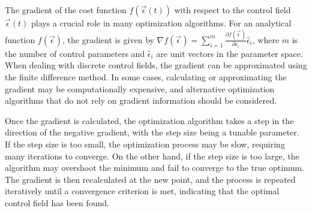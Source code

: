 \documentclass[12pt]{report}
\begin{document}
\par
The gradient of the cost function $f(\vec{\epsilon}(t))$ with respect to the control field $\vec{\epsilon}(t)$ plays a crucial role in many optimization algorithms. 
For an analytical function $f(\vec{\epsilon})$, the gradient is given by $\nabla f(\vec{\epsilon}) = \sum_{i=1}^m \frac{\partial f(\vec{\epsilon})}{\partial \epsilon_i} \hat{\epsilon}_i$, where $m$ is the number of control parameters and $\hat{\epsilon}_i$ are unit vectors in the parameter space. 
When dealing with discrete control fields, the gradient can be approximated using the finite difference method. In some cases, calculating or approximating the gradient may be computationally expensive, and alternative optimization algorithms that do not rely on gradient information should be considered.
\par
Once the gradient is calculated, the optimization algorithm takes a step in the direction of the negative gradient, with the step size being a tunable parameter. 
If the step size is too small, the optimization process may be slow, requiring many iterations to converge. 
On the other hand, if the step size is too large, the algorithm may overshoot the minimum and fail to converge to the true optimum. 
The gradient is then recalculated at the new point, and the process is repeated iteratively until a convergence criterion is met, indicating that the optimal control field has been found.

\end{document}
